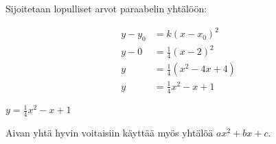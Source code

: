 \begin{esimerkki}
\begin{esimratk}
		Sijoitetaan lopulliset arvot paraabelin yhtälöön:

\begin{align*}	
    y - y_0 &= k(x-x_0)^2 \\
	y - 0 &= \frac{1}{4}(x-2)^2 \\
	y &= \frac{1}{4}(x^2-4x+4) \\
	y &= \frac{1}{4}x^2 - x + 1
\end{align*}


		\begin{esimvast}
			$y=\frac{1}{4}x^2 - x + 1$
			
			Aivan yhtä hyvin voitaisiin käyttää myös yhtälöä $ax^2 + bx +c$.
		\end{esimvast}


	\end{esimratk}
\end{esimerkki}




